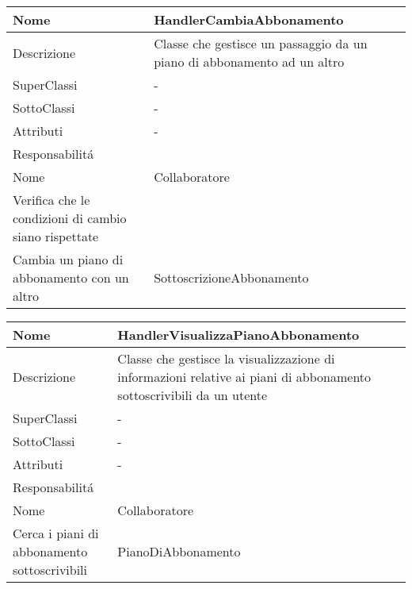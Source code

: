 \begin{center}
    \begin{longtable}{ |p{3cm}|p{3cm}|p{3cm}|p{3cm}| }
        \hline
        Nome & \multicolumn{3}{|p{9cm}|}{HandlerCambiaAbbonamento} \\\hline
        Descrizione & \multicolumn{3}{|p{9cm}|}{Classe che gestisce un passaggio da un piano di abbonamento ad un altro} \\\hline
        SuperClassi & \multicolumn{3}{|p{9cm}|}{-} \\\hline
        SottoClassi & \multicolumn{3}{|p{9cm}|}{-} \\\hline
        Attributi & \multicolumn{3}{|p{9cm}|}{-} \\\hline
        \multicolumn{4}{|p{12cm}|}{Responsabilit\'a} \\\hline
        \multicolumn{2}{|p{6cm}|}{Nome} & \multicolumn{2}{|p{6cm}|}{Collaboratore} \\\hline
        \multicolumn{2}{|p{6cm}|}{Verifica che le condizioni di cambio siano rispettate} & \multicolumn{2}{|p{6cm}|}{} \\\hline
        \multicolumn{2}{|p{6cm}|}{Cambia un piano di abbonamento con un altro} & \multicolumn{2}{|p{6cm}|}{SottoscrizioneAbbonamento} \\\hline
    \end{longtable}
\end{center}

\begin{center}
    \begin{longtable}{ |p{3cm}|p{3cm}|p{3cm}|p{3cm}| }
        \hline
        Nome & \multicolumn{3}{|p{9cm}|}{HandlerVisualizzaPianoAbbonamento} \\\hline
        Descrizione & \multicolumn{3}{|p{9cm}|}{Classe che gestisce la visualizzazione  di informazioni relative ai piani di abbonamento sottoscrivibili da un utente} \\\hline
        SuperClassi & \multicolumn{3}{|p{9cm}|}{-} \\\hline
        SottoClassi & \multicolumn{3}{|p{9cm}|}{-} \\\hline
        Attributi & \multicolumn{3}{|p{9cm}|}{-} \\\hline
        \multicolumn{4}{|p{12cm}|}{Responsabilit\'a} \\\hline
        \multicolumn{2}{|p{6cm}|}{Nome} & \multicolumn{2}{|p{6cm}|}{Collaboratore} \\\hline
        \multicolumn{2}{|p{6cm}|}{Cerca i piani di abbonamento sottoscrivibili} & \multicolumn{2}{|p{6cm}|}{PianoDiAbbonamento} \\\hline
    \end{longtable}
\end{center}

